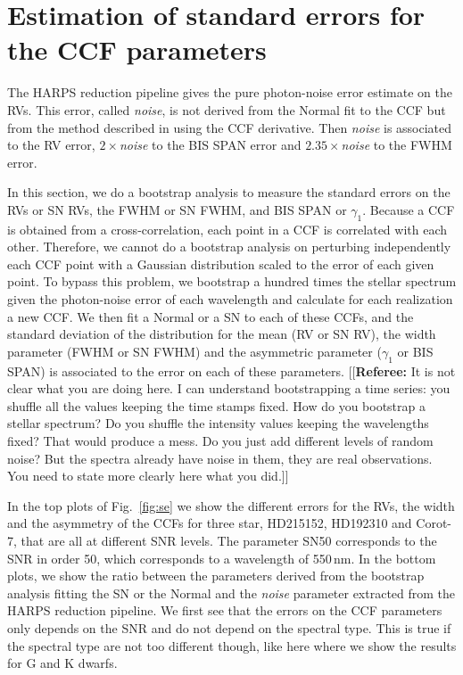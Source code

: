 \documentclass[11pt, oneside]{article}
\newcommand{\comment}[1]{{\color{red}[[\textbf{Referee: }#1]]}}
\begin{document}
\section{Estimation of standard errors for the CCF parameters} \label{sec:5}

The HARPS reduction pipeline gives the pure photon-noise error estimate on the RVs. This error, called \emph{noise}, is not derived from the Normal fit to the CCF but from the method described in \citet{Bouchy-2001b} using the CCF derivative. Then \emph{noise} is associated to the RV error, $2\times$\emph{noise} to the BIS SPAN error and $2.35\times$\emph{noise} to the FWHM error.

In this section, we do a bootstrap analysis to measure the standard errors on the RVs or SN RVs, the FWHM or SN FWHM, and BIS SPAN or $\gamma_1$. Because a CCF is obtained from a cross-correlation, each point in a CCF is correlated with each other. Therefore, we cannot do a bootstrap analysis on perturbing independently each CCF point with a Gaussian distribution scaled to the error of each given point. To bypass this problem, we bootstrap a hundred times the stellar spectrum given the photon-noise error of each wavelength and calculate for each realization a new CCF. We then fit a Normal or a SN to each of these CCFs, and the standard deviation of the distribution for the mean (RV or SN RV), the width parameter (FWHM or SN FWHM) and the asymmetric parameter ($\gamma_1$ or BIS SPAN) is associated to the error on each of these parameters.
\comment{It is not clear what you are doing here. I can understand bootstrapping a time series: you shuffle all the values keeping the time stamps fixed. How do you bootstrap a stellar spectrum? Do you shuffle the intensity values keeping the wavelengths fixed? That would produce a mess. Do you just add different levels of random noise? But the spectra already have noise in them, they are real observations. You need to state more clearly here what you did.}

In the top plots of Fig.~\ref{fig:se} we show the different errors for the RVs, the width and the asymmetry of the CCFs for three star, HD215152, HD192310 and Corot-7, that are all at different SNR levels. The parameter SN50 corresponds to the SNR in order 50, which corresponds to a wavelength of 550\,nm. In the bottom plots, we show the ratio between the parameters derived from the bootstrap analysis fitting the SN or the Normal and the \emph{noise} parameter extracted from the HARPS reduction pipeline. We first see that the errors on the CCF parameters only depends on the SNR and do not depend on the spectral type. This is true if the spectral type are not too different though, like here where we show the results for G and K dwarfs.
\end{document}
